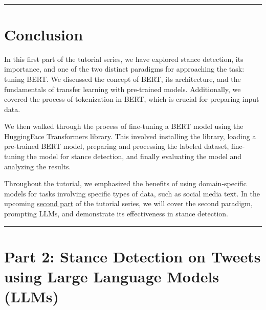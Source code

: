 \documentclass[11pt]{article}
\begin{document}
    \begin{center}
    \end{center}
    { \hspace*{\fill} \\}
    
    \begin{center}\rule{0.5\linewidth}{0.5pt}\end{center}

    \hypertarget{conclusion}{%
\section{Conclusion}\label{conclusion}}

    In this first part of the tutorial series, we have explored stance
detection, its importance, and one of the two distinct paradigms for
approaching the task: tuning BERT. We discussed the concept of BERT, its
architecture, and the fundamentals of transfer learning with pre-trained
models. Additionally, we covered the process of tokenization in BERT,
which is crucial for preparing input data.

We then walked through the process of fine-tuning a BERT model using the
HuggingFace Transformers library. This involved installing the library,
loading a pre-trained BERT model, preparing and processing the labeled
dataset, fine-tuning the model for stance detection, and finally
evaluating the model and analyzing the results.

Throughout the tutorial, we emphasized the benefits of using
domain-specific models for tasks involving specific types of data, such
as social media text. In the upcoming
\href{https://colab.research.google.com/drive/1IFr6Iz1YH9XBWUKcWZyTU-1QtxgYqrmX?usp=sharing}{second
part} of the tutorial series, we will cover the second paradigm,
prompting LLMs, and demonstrate its effectiveness in stance detection.
    

    

    \begin{center}\rule{\linewidth}{1pt}\end{center}
    
\section{Part 2: Stance Detection on Tweets using Large Language Models (LLMs)}
\label{stance-detection-on-tweets-using-nlp-methods---part-2}
\end{document}
